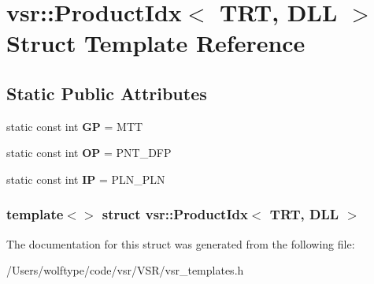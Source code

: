 \hypertarget{structvsr_1_1_product_idx_3_01_t_r_t_00_01_d_l_l_01_4}{\section{vsr\-:\-:Product\-Idx$<$ T\-R\-T, D\-L\-L $>$ Struct Template Reference}
\label{structvsr_1_1_product_idx_3_01_t_r_t_00_01_d_l_l_01_4}
}
\subsection*{Static Public Attributes}
\begin{DoxyCompactItemize}
\item 
\hypertarget{structvsr_1_1_product_idx_3_01_t_r_t_00_01_d_l_l_01_4_a24ffafd64eab4350ffb2f4cfc87ed3e5}{static const int {\bfseries G\-P} = M\-T\-T}\label{structvsr_1_1_product_idx_3_01_t_r_t_00_01_d_l_l_01_4_a24ffafd64eab4350ffb2f4cfc87ed3e5}

\item 
\hypertarget{structvsr_1_1_product_idx_3_01_t_r_t_00_01_d_l_l_01_4_a6409ff80ed70eaf00bd98fe6eca8c4fc}{static const int {\bfseries O\-P} = P\-N\-T\-\_\-\-D\-F\-P}\label{structvsr_1_1_product_idx_3_01_t_r_t_00_01_d_l_l_01_4_a6409ff80ed70eaf00bd98fe6eca8c4fc}

\item 
\hypertarget{structvsr_1_1_product_idx_3_01_t_r_t_00_01_d_l_l_01_4_aa7550b5dff300f340d77f3f084fe06ff}{static const int {\bfseries I\-P} = P\-L\-N\-\_\-\-P\-L\-N}\label{structvsr_1_1_product_idx_3_01_t_r_t_00_01_d_l_l_01_4_aa7550b5dff300f340d77f3f084fe06ff}

\end{DoxyCompactItemize}
\subsubsection*{template$<$$>$ struct vsr\-::\-Product\-Idx$<$ T\-R\-T, D\-L\-L $>$}



The documentation for this struct was generated from the following file\-:\begin{DoxyCompactItemize}
\item 
/\-Users/wolftype/code/vsr/\-V\-S\-R/vsr\-\_\-templates.\-h\end{DoxyCompactItemize}
